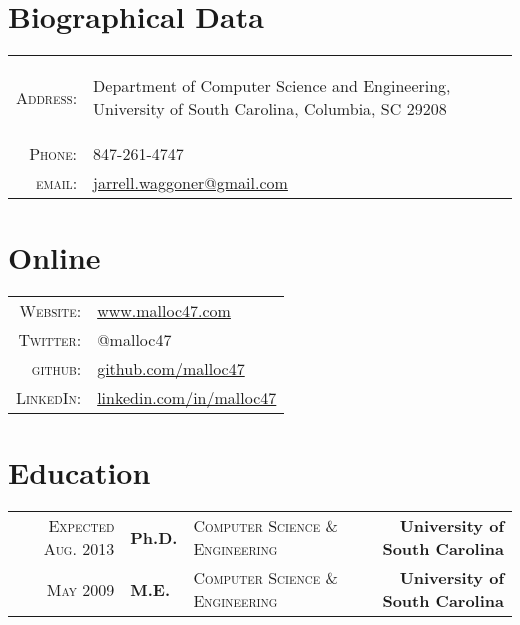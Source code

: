 \documentclass[a4paper,10pt]{article}
\begin{document}
\pagestyle{empty}

\par{\bigskip\par}



\begin{multicols}{2}
\setlength{\parskip}{0pt}
  \section{Biographical Data}

\begin{tabular}{r p{5.2cm}}
  \textsc{Address:}	& \begin{footnotesize} Department of Computer Science and Engineering, University of South Carolina, Columbia, SC 29208 \end{footnotesize} \\
  \textsc{Phone:}       & 847-261-4747\\
  \textsc{email:}       & \href{mailto:jarrell.waggoner@gmail.com}{jarrell.waggoner@gmail.com} \\
\end{tabular}

\vfill
\columnbreak

\section{Online}
\begin{tabular}{r p{5cm}}
  \textsc{Website:}	& \href{http://www.malloc47.com}{www.malloc47.com} \\
  \textsc{Twitter:}     & @malloc47 \\
  \textsc{github:}      & \href{http://www.github.com/malloc47}{github.com/malloc47}\\
  \textsc{LinkedIn:}    & \href{http://www.linkedin.com/in/malloc47}{linkedin.com/in/malloc47} \\
\end{tabular}

\end{multicols}

\section{Education}
\begin{tabular*}{\textwidth}{r l p{5.5cm} r}	
  \textsc{Expected Aug. 2013} & \textbf{Ph.D.} & \textsc{Computer Science \& Engineering} & \textbf{University of South Carolina}\\
  \textsc{May} 2009 & \textbf{M.E.} & \textsc{Computer Science \& Engineering} & \textbf{University of South Carolina}\\
\end{tabular*}
\end{document}

